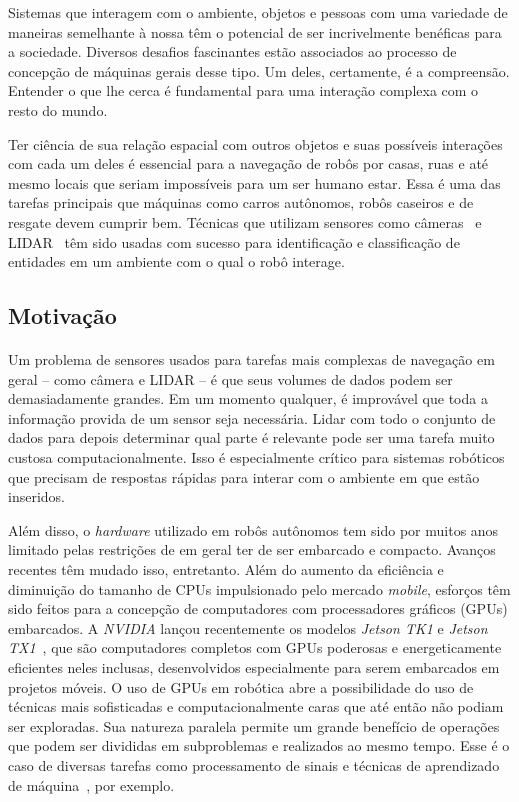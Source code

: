\documentclass[11pt]{article}
\newcommand{\tit}[1]{\textit{#1}}
\begin{document}
Sistemas que interagem com o ambiente, objetos e pessoas 
com uma variedade de maneiras semelhante à nossa têm o potencial de ser 
incrivelmente benéficas para a sociedade. 
Diversos desafios fascinantes estão associados ao processo de concepção de 
máquinas gerais desse tipo. 
Um deles, certamente, é a compreensão. 
Entender o que lhe cerca é fundamental para uma interação complexa com o resto
do mundo. 

Ter ciência de sua relação espacial com outros objetos e 
suas possíveis interações com cada um deles é essencial para a navegação 
de robôs por casas, ruas e até mesmo locais que seriam impossíveis 
para um ser humano estar. 
Essa é uma das tarefas principais que máquinas como carros autônomos, 
robôs caseiros e de resgate devem cumprir bem.
Técnicas que utilizam sensores como câmeras~\cite{vision} e LIDAR~\cite{car} 
têm sido usadas com sucesso para identificação e classificação de entidades 
em um ambiente com o qual o robô interage. 

\subsection{Motivação}
\paragraph{}
Um problema de sensores usados para tarefas mais complexas de navegação
em geral -- como câmera e LIDAR  --
é que seus volumes de dados podem ser demasiadamente grandes. 
Em um momento qualquer, é improvável que 
toda a informação provida de um sensor seja necessária. 
Lidar com todo o conjunto de dados para depois determinar qual parte é 
relevante pode ser uma tarefa muito custosa computacionalmente. 
Isso é especialmente crítico para sistemas robóticos que precisam de respostas
rápidas para interar com o ambiente em que estão inseridos. 

Além disso, o \tit{hardware} utilizado em robôs autônomos tem sido por muitos 
anos limitado pelas restrições de em geral ter de ser embarcado e compacto.
Avanços recentes têm mudado isso, entretanto. 
Além do aumento da eficiência e diminuição do tamanho de CPUs impulsionado
pelo mercado \tit{mobile}, esforços têm sido feitos para a concepção de 
computadores com processadores gráficos (GPUs) embarcados. 
A \tit{NVIDIA} lançou recentemente os modelos 
\tit{Jetson TK1} e \tit{Jetson TX1}~\cite{jetson}, que são computadores 
completos com GPUs poderosas e energeticamente eficientes neles inclusas, 
desenvolvidos especialmente para serem embarcados em projetos móveis.
O uso de GPUs em robótica abre a possibilidade do uso de técnicas mais 
sofisticadas e computacionalmente caras que até então não podiam ser exploradas.
Sua natureza paralela permite um grande benefício de operações que podem ser
divididas em subproblemas e realizados ao mesmo tempo. 
Esse é o caso de diversas tarefas como processamento de sinais e técnicas 
de aprendizado de máquina~\cite{gpu}, por exemplo. 
\end{document}
